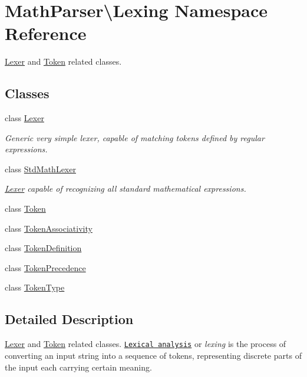 \hypertarget{namespaceMathParser_1_1Lexing}{\section{Math\-Parser\textbackslash{}Lexing Namespace Reference}
\label{namespaceMathParser_1_1Lexing}
}


\hyperlink{classMathParser_1_1Lexing_1_1Lexer}{Lexer} and \hyperlink{classMathParser_1_1Lexing_1_1Token}{Token} related classes.  


\subsection*{Classes}
\begin{DoxyCompactItemize}
\item 
class \hyperlink{classMathParser_1_1Lexing_1_1Lexer}{Lexer}
\begin{DoxyCompactList}\small\item\em Generic very simple lexer, capable of matching tokens defined by regular expressions. \end{DoxyCompactList}\item 
class \hyperlink{classMathParser_1_1Lexing_1_1StdMathLexer}{Std\-Math\-Lexer}
\begin{DoxyCompactList}\small\item\em \hyperlink{classMathParser_1_1Lexing_1_1Lexer}{Lexer} capable of recognizing all standard mathematical expressions. \end{DoxyCompactList}\item 
class \hyperlink{classMathParser_1_1Lexing_1_1Token}{Token}
\item 
class \hyperlink{classMathParser_1_1Lexing_1_1TokenAssociativity}{Token\-Associativity}
\item 
class \hyperlink{classMathParser_1_1Lexing_1_1TokenDefinition}{Token\-Definition}
\item 
class \hyperlink{classMathParser_1_1Lexing_1_1TokenPrecedence}{Token\-Precedence}
\item 
class \hyperlink{classMathParser_1_1Lexing_1_1TokenType}{Token\-Type}
\end{DoxyCompactItemize}


\subsection{Detailed Description}
\hyperlink{classMathParser_1_1Lexing_1_1Lexer}{Lexer} and \hyperlink{classMathParser_1_1Lexing_1_1Token}{Token} related classes. \href{https://en.wikipedia.org/wiki/Lexical_analysis}{\tt Lexical analysis} or {\itshape lexing} is the process of converting an input string into a sequence of tokens, representing discrete parts of the input each carrying certain meaning. 